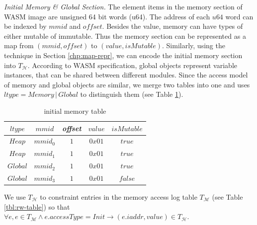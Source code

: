 \noindent\emph{Initial Memory \& Global Section.}
The element items in the memory section of WASM image are unsigned 64 bit words (u64). The address of each $u64$ word can be indexed by $mmid$ and $offset$. Besides the value, memory can have types of either mutable of immutable. Thus the memory section can be represented as a map from $(mmid, offset)$ to $(value, isMutable)$. Similarly, using the technique in Section \ref{chp:map-repr}, we can encode the initial memory section into $T_\mathcal{H}$. According to WASM specification, global objects represent variable instances, that can be shared between different modules. Since the access model of memory and global objects are similar, we merge two tables into one and uses $ltype = Memory \,|\, Global$ to distinguish them (see Table \ref{tbl:init-memory-table}).
\begin{table}[!h]
\begin{center}
\begin{tabular}{ | c | c | c | c | c | }
  \hline
  $ltype$ & $mmid$ & \emph{offset} & $value$ & $isMutable$ \\
  \hline
  $Heap$ & $mmid_0$ & $1$ & $0x01$ & $true$ \\
  \hline
  $Heap$ & $mmid_1$ & $1$ & $0x01$ & $true$ \\
  \hline
  $Global$ & $mmid_2$ & $1$ & $0x01$ & $true$ \\ 
  \hline
  $Global$ & $mmid_3$ & $1$ & $0x01$ & $false$ \\ 
  \hline
\end{tabular}
\caption{initial memory table}
\label{tbl:init-memory-table}
\end{center}
\end{table}

We use $T_\mathcal{H}$ to constraint entries in the memory access log table $T_\mathcal{M}$ (see Table \ref{tbl:rw-table}) so that $\forall e, e\in T_\mathcal{M} \wedge e.accessType = Init \rightarrow (e.iaddr, value) \in T_\mathcal{H}$.


